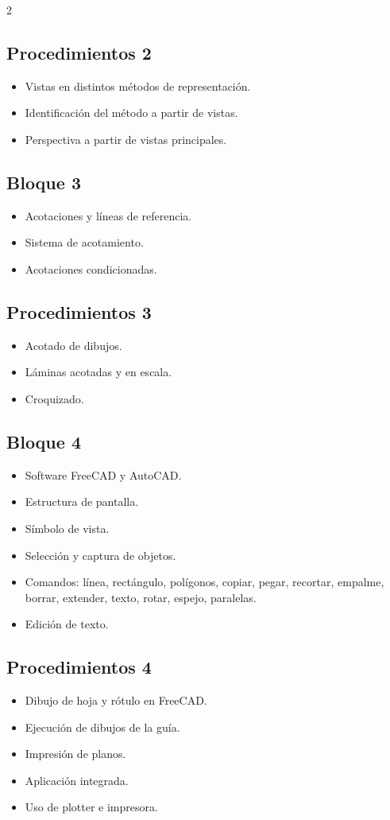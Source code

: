 \documentclass[12pt,a4paper]{article}
\begin{document}
\begin{multicols}{2}
\subsection*{Procedimientos 2}
\begin{itemize}
    \item Vistas en distintos métodos de representación.
    \item Identificación del método a partir de vistas.
    \item Perspectiva a partir de vistas principales.
\end{itemize}

\subsection*{Bloque 3}
\begin{itemize}
    \item Acotaciones y líneas de referencia.
    \item Sistema de acotamiento.
    \item Acotaciones condicionadas.
\end{itemize}

\subsection*{Procedimientos 3}
\begin{itemize}
    \item Acotado de dibujos.
    \item Láminas acotadas y en escala.
    \item Croquizado.
\end{itemize}

\subsection*{Bloque 4}
\begin{itemize}
    \item Software FreeCAD y AutoCAD.
    \item Estructura de pantalla.
    \item Símbolo de vista.
    \item Selección y captura de objetos.
    \item Comandos: línea, rectángulo, polígonos, copiar, pegar, recortar, empalme, borrar, extender, texto, rotar, espejo, paralelas.
    \item Edición de texto.
\end{itemize}

\subsection*{Procedimientos 4}
\begin{itemize}
    \item Dibujo de hoja y rótulo en FreeCAD.
    \item Ejecución de dibujos de la guía.
    \item Impresión de planos.
    \item Aplicación integrada.
    \item Uso de plotter e impresora.
\end{itemize}

\end{multicols}
\end{document}

